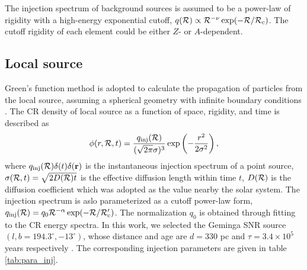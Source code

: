 \documentclass[a4paper,11pt]{article}
\begin{document}
The injection spectrum of background sources is assumed to be a power-law
of rigidity with a high-energy exponential cutoff, $q({\cal R}) \propto
{\cal R}^{-\nu} \exp(-{\cal R}/{\cal R}_{\rm c})$. The cutoff rigidity
of each element could be either $Z$- or $A$-dependent. 

\subsection{Local source}

Green's function method is adopted to calculate the propagation of particles from the local source, assuming a spherical geometry with 
infinite boundary conditions \citep{2012JCAP...01..011B, 2013APh....50...33S}. 
The  CR density of local source as a function of space, rigidity, and time is described as
\begin{equation}
\phi(r,{\cal R},t)=\frac{q_{\rm inj}({\cal R})}{(\sqrt{2\pi}\sigma)^3}
\exp\left(-\frac{r^2}{2\sigma^2}\right),
\end{equation}
where $q_{\rm inj}({\cal R})\delta(t)\delta({\bf r})$ is the instantaneous injection spectrum of a point source, $\sigma({\cal R},t)=\sqrt{2D({\cal R})t}$ 
is the effective diffusion length within time $t$, $D({\cal R})$ is the 
diffusion coefficient which was adopted as the value nearby the solar system. The injection spectrum is aslo parameterized
as a cutoff power-law form, $q_{\rm inj}({\cal R})=q_0{\cal R}^{-\alpha}
\exp(-{\cal R}/{\cal R}'_{\rm c})$.
The normalization $q_0$ is obtained
through fitting to the CR energy spectra.
In this work, we selected the Geminga SNR source $(l,b= 194.3^\circ,-13^\circ)$, whose distance and age are $d = 330$ pc and $\tau = 3.4 \times 10^5$ years respectively \citep {2017Sci...358..911A, 2007Ap&SS.308..225F}. 
The corresponding injection parameters are given in table \ref{tab:para_inj}.
\end{document}
